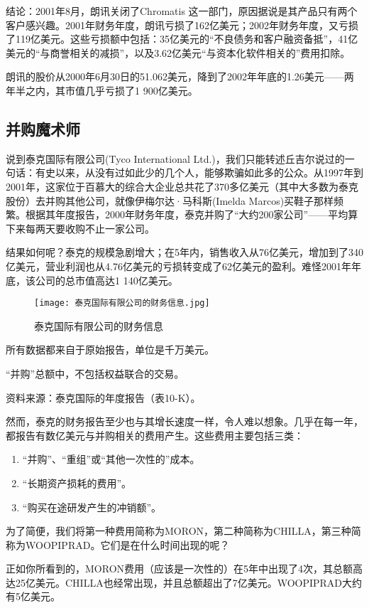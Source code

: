 \documentclass[12pt,oneside]{book}
\begin{document}
结论：2001年8月，朗讯关闭了Chromatis 这一部门，原因据说是其产品只有两个客户感兴趣。2001年财务年度，朗讯亏损了162亿美元；2002年财务年度，又亏损了119亿美元。这些亏损额中包括：35亿美元的“不良债务和客户融资备抵”，41亿美元的“与商誉相关的减损”，以及3.62亿美元“与资本化软件相关的”费用扣除。

朗讯的股价从2000年6月30日的51.062美元，降到了2002年年底的1.26美元——两年半之内，其市值几乎亏损了1 900亿美元。

\subsection{并购魔术师}
说到泰克国际有限公司(Tyco International Ltd.)，我们只能转述丘吉尔说过的一句话：有史以来，从没有过如此少的几个人，能够欺骗如此多的公众。从1997年到2001年，这家位于百慕大的综合大企业总共花了370多亿美元（其中大多数为泰克股份）去并购其他公司，就像伊梅尔达·马科斯(Imelda Marcos)买鞋子那样频繁。根据其年度报告，2000年财务年度，泰克并购了“大约200家公司”——平均算下来每两天要收购不止一家公司。

结果如何呢？泰克的规模急剧增大；在5年内，销售收入从76亿美元，增加到了340亿美元，营业利润也从4.76亿美元的亏损转变成了62亿美元的盈利。难怪2001年年底，该公司的总市值高达1 140亿美元。

\begin{figure}[H]
\centering
\texttt{[image: 泰克国际有限公司的财务信息.jpg]}
\caption{泰克国际有限公司的财务信息}
\end{figure}

所有数据都来自于原始报告，单位是千万美元。

“并购”总额中，不包括权益联合的交易。

资料来源：泰克国际的年度报告（表10-K）。

然而，泰克的财务报告至少也与其增长速度一样，令人难以想象。几乎在每一年，都报告有数亿美元与并购相关的费用产生。这些费用主要包括三类：

\begin{enumerate}
\item “并购”、“重组”或“其他一次性的”成本。
\item “长期资产损耗的费用”。
\item “购买在途研发产生的冲销额”。
\end{enumerate}

为了简便，我们将第一种费用简称为MORON，第二种简称为CHILLA，第三种简称为WOOPIPRAD。它们是在什么时间出现的呢？

正如你所看到的，MORON费用（应该是一次性的）在5年中出现了4次，其总额高达25亿美元。CHILLA也经常出现，并且总额超出了7亿美元。WOOPIPRAD大约有5亿美元。
\end{document}
